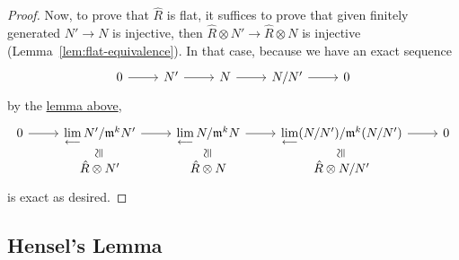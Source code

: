 \begin{proof}
    Now, to prove that \(\hat{R}\) is flat,
    it suffices to prove that given finitely generated \(N' \to N\) is injective,
    then \(\hat{R} \otimes N' \to \hat{R} \otimes N\) is injective (Lemma~\ref{lem:flat-equivalence}).
    In that case, because we have an exact sequence
    \begin{equation*}
        \begin{tikzcd}
            0 \arrow{r} & N' \arrow{r} & N \arrow{r} & N/N' \arrow{r} & 0
        \end{tikzcd}
    \end{equation*}
    by the \hyperref[lem:m-adic-invlim-exact]{lemma above},
    \begin{equation*}
        \begin{tikzcd}[row sep=tiny]
            0 \arrow{r} & \invlim N'/\mfk{m}^k N' \arrow{r} & \invlim N/\mfk{m}^k N \arrow{r} &
            \invlim (N/N')/\mfk{m}^k(N/N') \arrow{r} & 0 \\
            & \hat{R} \otimes N' \arrow[phantom]{u}[sloped]{\cong} &
            \hat{R} \otimes N \arrow[phantom]{u}[sloped]{\cong} &
            \hat{R} \otimes N/N' \arrow[phantom]{u}[sloped]{\cong}
        \end{tikzcd}
    \end{equation*}
    is exact as desired.
\end{proof}

\subsection*{Hensel's Lemma}

